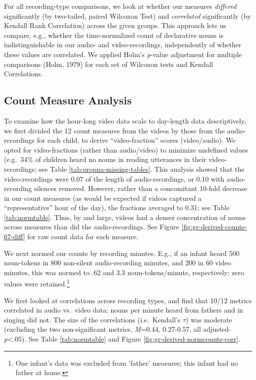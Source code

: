 \documentclass[man]{apa6}
\theoremstyle{definition}
\theoremstyle{definition}
\theoremstyle{definition}
\theoremstyle{remark}
\begin{document}
For all recording-type comparisons, we look at whether our measures
\emph{differed} significantly (by two-tailed, paired Wilcoxon Test) and
\emph{correlated} significantly (by Kendall Rank Correlation) across the
given groups. This approach lets us compare, e.g., whether the
time-normalized count of declarative nouns is indistinguishable in our
audio- and video-recordings, independently of whether these values are
correlated. We applied Holm's \emph{p}-value adjustment for multiple
comparisons (Holm, 1979) for each set of Wilcoxon tests and Kendall
Correlations.

\subsection{Count Measure Analysis}\label{count-measure-analysis}

To examine how the hour-long video data scale to day-length data
descriptively, we first divided the 12 count measures from the videos by
those from the audio-recordings for each child, to derive
\enquote{video-fraction} scores (video/audio). We opted for
video-fractions (rather than audio/video) to minimize undefined values
(e.g.~34\% of children heard no nouns in reading utterances in their
video-recordings; see Table \ref{tab:propna-missing-tables}. This
analysis showed that the video-recordings were 0.07 of the length of
audio-recordings, or 0.10 with audio-recording silences removed.
However, rather than a concomitant 10-fold decrease in our count
measures (as would be expected if videos captured a
\enquote{representative} hour of the day), the fractions averaged to
0.31; see Table \ref{tab:normtable}. Thus, by and large, videos had a
denser concentration of nouns across measures than did the
audio-recordings. See Figure \ref{fig:gr-derived-counts-67-diff} for raw
count data for each measure.

We next normed our counts by recording minutes. E.g., if an infant heard
500 noun-tokens in 800 non-silent audio-recording minutes, and 200 in 60
video minutes, this was normed to .62 and 3.3 noun-tokens/minute,
respectively; zero values were
retained.\footnote{One infant's data was excluded from 'father' measures; this infant had no father at home.}

We first looked at correlations across recording types, and find that
10/12 metrics correlated in audio vs.~video data; nouns per minute heard
from fathers and in singing did not. The size of the correlations
(i.e.~Kendall's \(\tau\)) was moderate (excluding the two
non-significant metrics, \emph{M}=0.44, 0.27-0.57, all
adjusted-\emph{p}\textless{}.05). See Table \ref{tab:normtable} and
Figure \ref{fig:gr-derived-normcounts-corr}.
\end{document}
